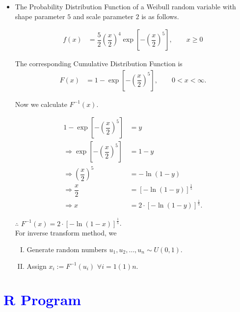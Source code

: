 \documentclass[11pt, a4paper]{article}\usepackage[]{graphicx}\usepackage[]{xcolor}
\begin{document}
\begin{itemize}
\item[\scalebox{2.0}{\twemoji{keycap: 1}}] \hspace{0.1cm} The Probability Distribution Function of a Weibull random variable with shape parameter $5$ and scale parameter $2$ is as follows.

\begin{align*}
f(x) &= \dfrac{5}{2} \left(\dfrac{x}{2}\right)^{4} \exp\!\left[ -\left(\dfrac{x}{2}\right)^{5} \right], \qquad x \ge 0
\end{align*}

The corresponding Cumulative Distribution Function is
\begin{align*}
F(x) &= 1 - \exp\!\left[- \left( \dfrac{x}{2} \right)^5 \right], \qquad 0 < x < \infty.
\end{align*}

Now we calculate $F^{-1}(x)$.

\begin{align*}
1 - \exp\!\left[- \left( \dfrac{x}{2} \right)^5 \right] &= y \\[0.2em]
\Rightarrow \exp\!\left[- \left( \dfrac{x}{2} \right)^5 \right] &= 1 - y \\[0.2em]
\Rightarrow \left( \dfrac{x}{2} \right)^5 &= - \ln (1 - y) \\[0.2em]
\Rightarrow \dfrac{x}{2} &= \left[- \ln (1 - y) \right]^{\frac{1}{5}} \\[0.2em]
\Rightarrow x &= 2 \cdot \left[- \ln (1 - y) \right]^{\frac{1}{5}} .
\end{align*}

$\therefore$ $F^{-1}(x) = 2 \cdot \left[- \ln (1 - x) \right]^{\frac{1}{5}}$. \\[0.3em]

For inverse transform method, we 

\begin{enumerate}[I.]
\item Generate random numbers $u_1, u_2, \ldots, u_n \sim U(0, 1)$.
\item Assign $x_i := F^{-1}(u_i) \,\, \forall i = 1(1)n$.
\end{enumerate}

\end{itemize}

\section*{\faArrowAltCircleRight[regular] \textcolor{blue}{R Program}}
\end{document}

